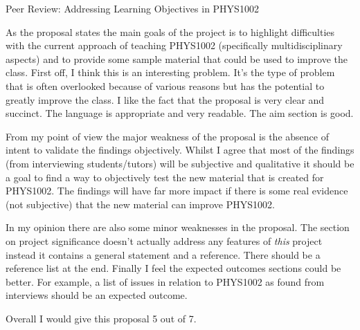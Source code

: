\documentclass[12pt,a4paper]{article}  %
\begin{document}
\begin{center}
  \Large Peer Review: Addressing Learning Objectives in PHYS1002
  \\[1cm]
\end{center}

As the proposal states the main goals of the project is to highlight
difficulties with the current approach of teaching PHYS1002
(specifically multidisciplinary aspects) and to provide some sample
material that could be used to improve the class. First off, I think
this is an interesting problem. It's the type of problem that is often
overlooked because of various reasons but has the potential to greatly
improve the class.  I like the fact that the proposal is very clear
and succinct. The language is appropriate and very readable. The aim
section is good.

From my point of view the major weakness of the proposal is the
absence of intent to validate the findings objectively. Whilst I agree
that most of the findings (from interviewing students/tutors) will be
subjective and qualitative it should be a goal to find a way to
objectively test the new material that is created for PHYS1002. The
findings will have far more impact if there is some real evidence (not
subjective) that the new material can improve PHYS1002.

In my opinion there are also some minor weaknesses in the proposal.
The section on project significance doesn't actually address any
features of \emph{this} project instead it contains a general
statement and a reference. There should be a reference list at the
end. Finally I feel the expected outcomes sections could be better.
For example, a list of issues in relation to PHYS1002 as found from
interviews should be an expected outcome.

Overall I would give this proposal 5 out of 7.
\end{document}
